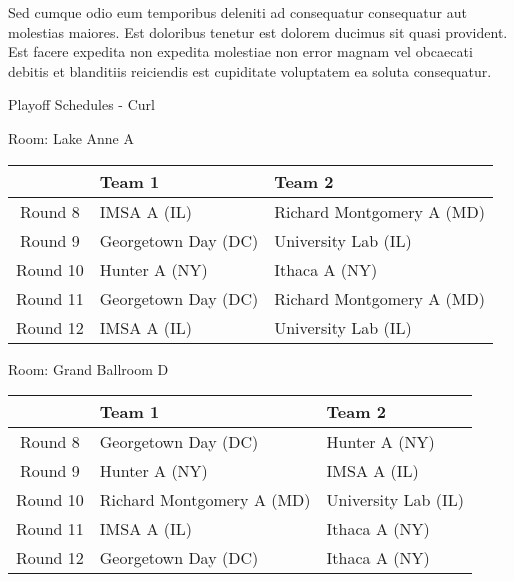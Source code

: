 \documentclass{article}%
\begin{document}
\newline%
Sed cumque odio eum temporibus deleniti ad consequatur consequatur aut molestias maiores. Est doloribus tenetur est dolorem ducimus sit quasi provident. Est facere expedita non expedita molestiae non error magnam vel obcaecati debitis et blanditiis reiciendis est cupiditate voluptatem ea soluta consequatur.%
\newpage%
\begin{center}%
\begin{Huge}%
Playoff Schedules {-} Curl%
\end{Huge}%
\end{center}%
\begin{flushleft}%
\begin{Large}%
Room: Lake Anne A%
\end{Large}%
\end{flushleft}%
\begin{tabularx}{\textwidth}{|c|Y|Y|}%
\hline%
&Team 1&Team 2\\%
\hline%
Round 8&IMSA A (IL)&Richard Montgomery A (MD)\\%
Round 9&Georgetown Day (DC)&University Lab (IL)\\%
Round 10&Hunter A (NY)&Ithaca A (NY)\\%
Round 11&Georgetown Day (DC)&Richard Montgomery A (MD)\\%
Round 12&IMSA A (IL)&University Lab (IL)\\%
\hline%
\end{tabularx}%
\vspace*{8pt}%
\linebreak%
\begin{flushleft}%
\begin{Large}%
Room: Grand Ballroom D%
\end{Large}%
\end{flushleft}%
\begin{tabularx}{\textwidth}{|c|Y|Y|}%
\hline%
&Team 1&Team 2\\%
\hline%
Round 8&Georgetown Day (DC)&Hunter A (NY)\\%
Round 9&Hunter A (NY)&IMSA A (IL)\\%
Round 10&Richard Montgomery A (MD)&University Lab (IL)\\%
Round 11&IMSA A (IL)&Ithaca A (NY)\\%
Round 12&Georgetown Day (DC)&Ithaca A (NY)\\%
\hline%
\end{tabularx}%
\vspace*{8pt}%
\linebreak%
\end{document}
